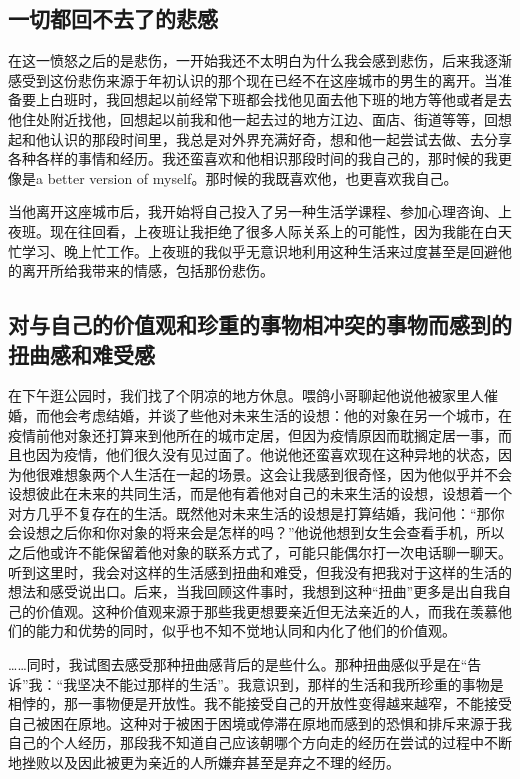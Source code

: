 

\subsection*{一切都回不去了的悲感}

在这一愤怒之后的是悲伤，一开始我还不太明白为什么我会感到悲伤，后来我逐渐感受到这份悲伤来源于年初认识的那个现在已经不在这座城市的男生的离开。当准备要上白班时，我回想起以前经常下班都会找他见面\pozhehao{}去他下班的地方等他或者是去他住处附近找他，回想起以前我和他一起去过的地方\pozhehao{}江边、面店、街道等等，回想起和他认识的那段时间里，我总是对外界充满好奇，想和他一起尝试去做、去分享各种各样的事情和经历。我还蛮喜欢和他相识那段时间的我自己的，那时候的我更像是a better version of myself。那时候的我既喜欢他，也更喜欢我自己。

当他离开这座城市后，我开始将自己投入了另一种生活\pozhehao{}学课程、参加心理咨询、上夜班。现在往回看，上夜班让我拒绝了很多人际关系上的可能性，因为我能在白天忙学习、晚上忙工作。上夜班的我似乎无意识地利用这种生活来过度甚至是回避他的离开所给我带来的情感，包括那份悲伤。



\subsection*{对与自己的价值观和珍重的事物相冲突的事物而感到的扭曲感和难受感}

在下午逛公园时，我们找了个阴凉的地方休息。喂鸽小哥聊起他说他被家里人催婚，而他会考虑结婚，并谈了些他对未来生活的设想：他的对象在另一个城市，在疫情前他对象还打算来到他所在的城市定居，但因为疫情原因而耽搁定居一事，而且也因为疫情，他们很久没有见过面了。他说他还蛮喜欢现在这种异地的状态，因为他很难想象两个人生活在一起的场景。这会让我感到很奇怪，因为他似乎并不会设想彼此在未来的共同生活，而是他有着他对自己的未来生活的设想，设想着一个对方几乎不复存在的生活。既然他对未来生活的设想是打算结婚，我问他：“那你会设想之后你和你对象的将来会是怎样的吗？”他说他想到女生会查看手机，所以之后他或许不能保留着他对象的联系方式了，可能只能偶尔打一次电话聊一聊天。听到这里时，我会对这样的生活感到扭曲和难受，但我没有把我对于这样的生活的想法和感受说出口。后来，当我回顾这件事时，我想到这种“扭曲”更多是出自我自己的价值观。这种价值观来源于那些我更想要亲近但无法亲近的人，而我在羡慕他们的能力和优势的同时，似乎也不知不觉地认同和内化了他们的价值观。

……同时，我试图去感受那种扭曲感背后的是些什么。那种扭曲感似乎是在“告诉”我：“我坚决不能过那样的生活”。我意识到，那样的生活和我所珍重的事物是相悖的，那一事物便是开放性。我不能接受自己的开放性变得越来越窄，不能接受自己被困在原地。这种对于被困于困境或停滞在原地而感到的恐惧和排斥来源于我自己的个人经历，那段我不知道自己应该朝哪个方向走的经历\pozhehao{}在尝试的过程中不断地挫败以及因此被更为亲近的人所嫌弃甚至是弃之不理的经历。

